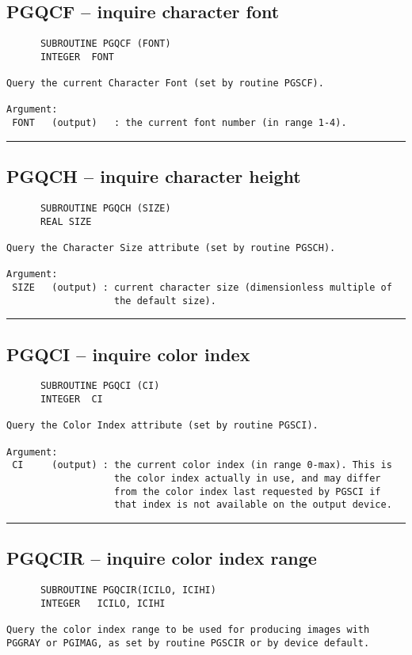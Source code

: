 {\subsection*{PGQCF -- inquire character font }
\begin{verbatim}
      SUBROUTINE PGQCF (FONT)
      INTEGER  FONT

Query the current Character Font (set by routine PGSCF).

Argument:
 FONT   (output)   : the current font number (in range 1-4).
\end{verbatim}
\hrule


\subsection*{PGQCH -- inquire character height }
\begin{verbatim}
      SUBROUTINE PGQCH (SIZE)
      REAL SIZE

Query the Character Size attribute (set by routine PGSCH).

Argument:
 SIZE   (output) : current character size (dimensionless multiple of
                   the default size).
\end{verbatim}
\hrule


\subsection*{PGQCI -- inquire color index }
\begin{verbatim}
      SUBROUTINE PGQCI (CI)
      INTEGER  CI

Query the Color Index attribute (set by routine PGSCI).

Argument:
 CI     (output) : the current color index (in range 0-max). This is
                   the color index actually in use, and may differ
                   from the color index last requested by PGSCI if
                   that index is not available on the output device.
\end{verbatim}
\hrule


\subsection*{PGQCIR -- inquire color index range }
\begin{verbatim}
      SUBROUTINE PGQCIR(ICILO, ICIHI)
      INTEGER   ICILO, ICIHI

Query the color index range to be used for producing images with
PGGRAY or PGIMAG, as set by routine PGSCIR or by device default.


\end{verbatim}}
